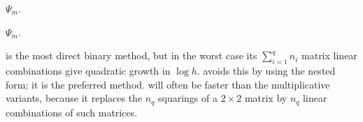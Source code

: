 \documentclass[a4paper,fleqn]{cas-sc}
\begin{document}
\begin{algorithm}
\caption{Binary, multiplicative.\\
Input: $r,l,m\geq r+l$, binary representation \eqref{eq:bin}, \eqref{eq:hj}.\\
Output: An expression for $\Psi_m$ in terms of $\Psi_{r+l}$, $\Psi_r$, $\Psi_{m_0}$.}
\label{alg:ALG4}
\begin{algorithmic}
\ENDIF
{}
\ENDFOR
{}
\ENDFOR
\RETURN $\Psi_m$.
\end{algorithmic}
\end{algorithm}

\begin{algorithm}
\caption{Nested binary, multiplicative.\\
Input: $r,l,m\geq r+l$, nested binary representation \eqref{eq:ms}, \eqref{eq:kj}.\\
Output: An expression for $\Psi_m$ in terms of $\Psi_{r+l}$, $\Psi_r$, $\Psi_{m_0}$.}
\label{alg:ALG5}
\begin{algorithmic}
\ENDIF
{}
\ENDFOR
{}
\ENDIF
\ENDFOR
{}
\RETURN $\Psi_m$.
\end{algorithmic}
\end{algorithm}

 is the most direct binary method, but in the worst case its $\sum_{i=1}^q n_i$ matrix linear combinations give quadratic growth in $\log h$.  avoids this by using the nested form; it is the preferred method.  will often be faster than the multiplicative variants, because it replaces the $n_q$ squarings of a $2\times2$ matrix by $n_q$ linear combinations of such matrices.
\end{document}
